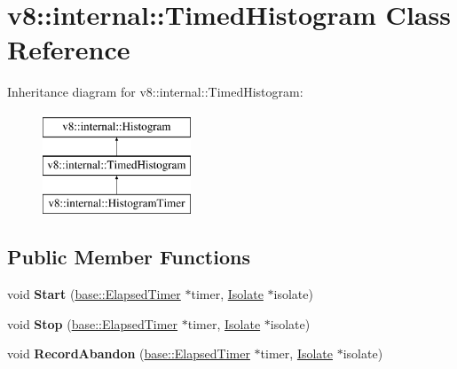 \hypertarget{classv8_1_1internal_1_1TimedHistogram}{}\section{v8\+:\+:internal\+:\+:Timed\+Histogram Class Reference}
\label{classv8_1_1internal_1_1TimedHistogram}
Inheritance diagram for v8\+:\+:internal\+:\+:Timed\+Histogram\+:\begin{figure}[H]
\begin{center}
\leavevmode
\includegraphics[height=3.000000cm]{classv8_1_1internal_1_1TimedHistogram}
\end{center}
\end{figure}
\subsection*{Public Member Functions}
\begin{DoxyCompactItemize}
\item 
\mbox{\label{classv8_1_1internal_1_1TimedHistogram_a9b083e293d632012ec70f99ce3c39acd}} 
void {\bfseries Start} (\mbox{\hyperlink{classv8_1_1base_1_1ElapsedTimer}{base\+::\+Elapsed\+Timer}} $\ast$timer, \mbox{\hyperlink{classv8_1_1internal_1_1Isolate}{Isolate}} $\ast$isolate)
\item 
\mbox{\label{classv8_1_1internal_1_1TimedHistogram_acdb2dc2ba00f763de37cf6a13637a88e}} 
void {\bfseries Stop} (\mbox{\hyperlink{classv8_1_1base_1_1ElapsedTimer}{base\+::\+Elapsed\+Timer}} $\ast$timer, \mbox{\hyperlink{classv8_1_1internal_1_1Isolate}{Isolate}} $\ast$isolate)
\item 
\mbox{\label{classv8_1_1internal_1_1TimedHistogram_ad5fb3cb753207170835eb57943a8572a}} 
void {\bfseries Record\+Abandon} (\mbox{\hyperlink{classv8_1_1base_1_1ElapsedTimer}{base\+::\+Elapsed\+Timer}} $\ast$timer, \mbox{\hyperlink{classv8_1_1internal_1_1Isolate}{Isolate}} $\ast$isolate)
\end{DoxyCompactItemize}
